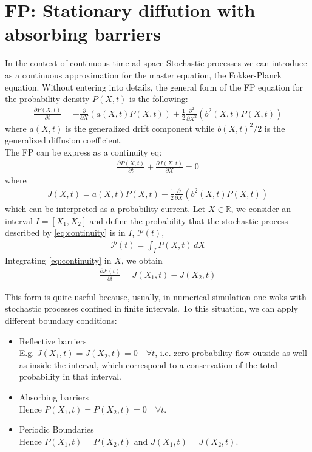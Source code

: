 \documentclass[4apaper,11pt,fleqn]{article}
\theoremstyle{remark}
\theoremstyle{definition}
\begin{document}
\section{FP: Stationary diffution with absorbing barriers}
In the context of continuous time ad space Stochastic processes we can introduce as a continuous approximation for the master equation, the Fokker-Planck equation.
Without entering into details, the general form of the FP equation for the probability density $P(X,t)$ is the following:
\begin{align*}
  \frac{\partial P(X, t)}{\partial t}=-\frac{\partial}{\partial X}(a(X, t) P(X, t))+\frac{1}{2} \frac{\partial^{2}}{\partial X^{2}}\left(b^{2}(X, t) P(X, t)\right)
\end{align*}
where $a(X,t)$ is the generalized drift component while $b(X,t)^2/2$ is the generalized diffusion coefficient.\\
The FP can be express as a continuity eq:
\begin{align}
  \label{eq:continuity}
  \frac{\partial P(X, t)}{\partial t}+\frac{\partial J(X, t)}{\partial X}=0
\end{align}
where
\begin{align*}
  J(X, t)=a(X, t) P(X, t)-\frac{1}{2} \frac{\partial}{\partial X}\left(b^{2}(X, t) P(X, t)\right)
\end{align*}
which can be interpreted as a probability current.
Let $X \in \mathbb{R}$, we consider an interval $I=[X_1,X_2]$ and define the probability that the stochastic process described by \eqref{eq:continuity} is in $I$, $\mathcal{P}(t)$,
\begin{align*}
  \mathcal{P}(t) = \int_I P(X,t) \, dX
\end{align*}
Integrating \eqref{eq:continuity} in $X$, we obtain
\begin{align*}
  \frac{\partial \mathcal{P}(t)}{\partial t}=J\left(X_{1}, t\right)-J\left(X_{2}, t\right)
\end{align*}

This form is quite useful because, usually, in numerical simulation one woks with stochastic processes confined in finite intervals. To this situation, we can apply different boundary conditions:
\begin{itemize}[leftmargin=*]
  \item Reflective barriers\\
  E.g. $J(X_1,t)=J(X_2,t)=0 \quad \forall t$, i.e. zero probability flow outside as well as inside the interval, which correspond to a conservation of the total probability in that interval.
  \item Absorbing barriers\\
  Hence $P(X_1,t) = P(X_2,t) = 0 \quad \forall t$.
  \item Periodic Boundaries\\
  Hence $P(X_1,t) = P(X_2,t)$ and $J(X_1,t)=J(X_2,t)$.
\end{itemize}
\end{document}
